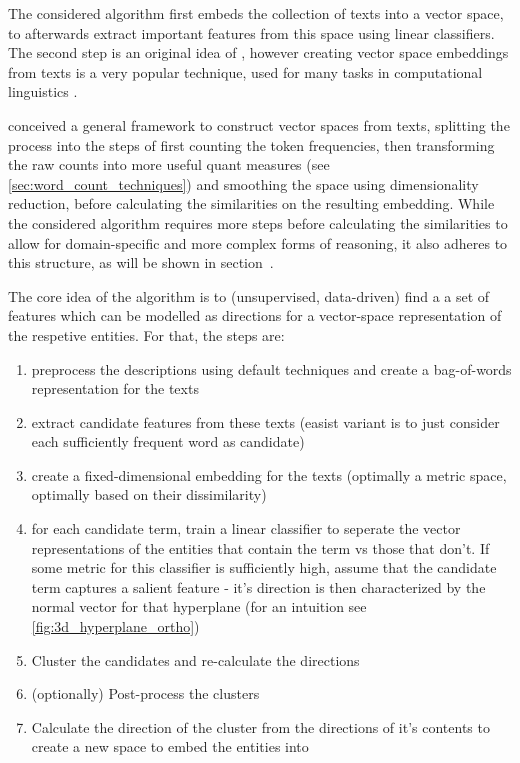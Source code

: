 The considered algorithm first embeds the collection of texts into a vector space, to afterwards extract important features from this space using linear classifiers. The second step is an original idea of \cite{Derrac2015}, however creating vector space embeddings from texts is a very popular technique, used for many tasks in computational linguistics \cite{Mikolov:Regularities,Mikolov2013a,Guo,Lowe,Turney2010}. %

 \textcite{Lowe} conceived a general framework to construct vector spaces from texts, splitting the process into the steps of first counting the token frequencies, then transforming the raw counts into more useful \gls{quant} measures (see \ref{sec:word_count_techniques}) %
  and smoothing the space using dimensionality reduction, before calculating the similarities on the resulting embedding. While the considered algorithm requires more steps before calculating the similarities to allow for domain-specific and more complex forms of reasoning, it also adheres to this structure, as will be shown in section~.



The core idea of the algorithm is to (unsupervised, data-driven) find a a set of features which can be modelled as directions for a vector-space representation of the respetive entities. For that, the steps are:

\begin{enumerate}
	\item preprocess the descriptions using default techniques and create a bag-of-words representation for the texts
	\item extract candidate features from these texts (easist variant is to just consider each sufficiently frequent word as candidate)
	\item create a fixed-dimensional embedding for the texts (optimally a metric space, optimally based on their dissimilarity)
	\item for each candidate term, train a linear classifier to seperate the vector representations of the entities that contain the term vs those that don't. If some metric for this classifier is sufficiently high, assume that the candidate term captures a salient feature - it's direction is then characterized by the normal vector for that hyperplane (for an intuition see \ref{fig:3d_hyperplane_ortho})
	\item Cluster the candidates and re-calculate the directions
	\item (optionally) Post-process the clusters 
	\item Calculate the direction of the cluster from the directions of it's contents to create a new space to embed the entities into
\end{enumerate}


